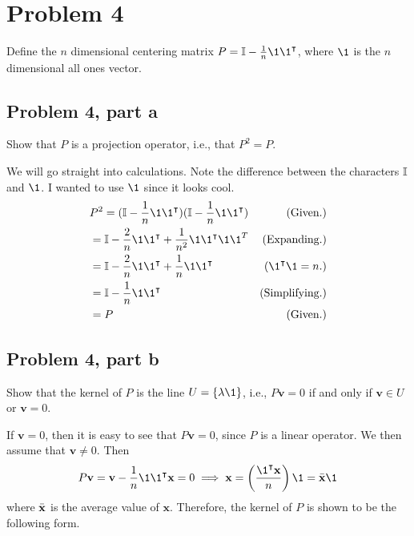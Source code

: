\newpage
\section{Problem 4}
Define the $n$ dimensional centering matrix $P = \id - \frac{1}{n} \1 \1\T$, where $\1$ is the $n$ dimensional all ones vector. 
\subsection{Problem 4, part a}
Show that $P$ is a projection operator, i.e., that $P^2 = P$.
\partbreak
\begin{solution}

    We will go straight into calculations. Note the difference between the characters $\mathbb{I}$ and $\1$. I wanted to use $\1$ since it looks cool. 
    \tightalignbreak
    \begin{align*}
        &P^2 = (\id - \frac{1}{n}\1\1\T)(\id - \frac{1}{n}\1\1\T) &\text{(Given.)}\\
        &= \id - \frac{2}{n}\1\1\T + \frac{1}{n^2} \1\1\T\1\1^T &\text{(Expanding.)}\\
        &= \id - \frac{2}{n}\1\1\T + \frac{1}{n}\1\1\T &(\1\T\1 = n.)\\
        &= \id - \frac{1}{n}\1\1\T &\text{(Simplifying.)}\\
        &= P &\text{(Given.)}
    \end{align*}\vspace{-12mm}\alignbreak
\end{solution}


\newpage
\subsection{Problem 4, part b}
Show that the kernel of $P$ is the line $U = \{\lm\1\}$, i.e., $P\textbf{v} = 0$ if and only if $\textbf{v} \in U$ or $\textbf{v} = 0$.
\partbreak
\begin{solution}

    If $\textbf{v} = 0$, then it is easy to see that $P\textbf{v}= 0$, since $P$ is a linear operator. We then assume that $\textbf{v} \neq 0$. Then 
    \[P\textbf{v} = \textbf{v} - \frac{1}{n}\1\1\T\textbf{x} = 0 \implies \textbf{x} = \left(\frac{\1\T \textbf{x}}{n}\right) \1 = \Bar{\textbf{x}}\1\]
    where $\Bar{\textbf{x}}$ is the average value of $\textbf{x}$. Therefore, the kernel of $P$ is shown to be the following form. 
\end{solution}


\newcommand{\bmu}{\boldsymbol{\mu}}
\newpage

